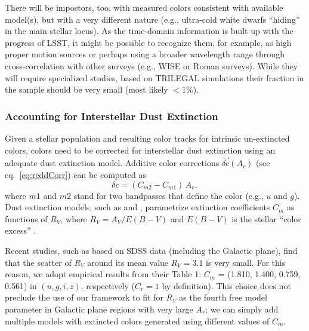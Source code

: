 There will be impostors, too, with measured colors consistent with available model(s), but
with a very different nature (e.g., ultra-cold white dwarfs ``hiding'' in the main stellar locus).
As the time-domain information is built up with the progress of LSST, 
it might be possible to recognize them, for example, as high proper motion sources or perhaps
using a broader wavelength range through cross-correlation with other surveys (e.g., WISE or
Roman surveys). While they will require specialized studies, based on TRILEGAL simulations
their fraction in the sample should be very small (most likely $<1$\%). 


\subsubsection{Accounting for Interstellar Dust Extinction} 

Given a stellar population and resulting color tracks for intrinsic un-extincted colors, colors need to
be corrected for interstellar dust extinction using an adequate dust extinction model. Additive color
corrections $\vec{\delta c}(A_r)$ (see eq.~\ref{eq:reddCorr}) can be computed as 
\begin{equation}
 \label{eq:extCorr} 
                      \delta c = (C_{m2}- C_{m1}) \, A_r,
\end{equation}
where $m1$ and $m2$ stand for two bandpasses that define the color (e.g., $u$ and $g$).  
Dust extinction models, such as \cite{1989ApJ...345..245C} and
\cite{1999PASP..111...63F}, parametrize extinction coefficients $C_{m}$ as functions of $R_V$, where
$R_V = A_V/E(B-V)$ and $E(B-V)$ is the stellar ``color excess'' \citep{1989ApJ...345..245C}.

Recent studies, such as \cite{2012ApJ...757..166B} based on SDSS data (including the Galactic plane), 
find that the scatter of $R_V$ around its mean value $R_V=3.1$ is very small. For this reason, we adopt
empirical results from their Table 1: $C_m$ = (1.810, 1.400, 0.759, 0.561) in $(u, g, i, z)$, respectively ($C_r=1$
by definition). This choice does not preclude the use of our framework to fit for $R_V$ as the fourth free
model parameter in Galactic plane regions with very large $A_r$; we  can simply add multiple models
with extincted colors generated using different values of $C_m$. 

